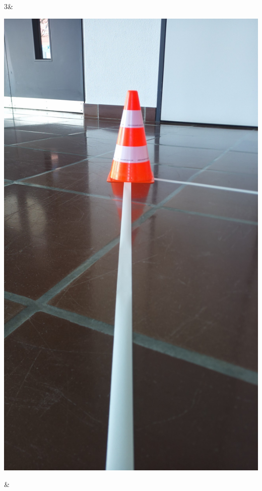 \begin{table}[H]
\begin{tabularx}
        3&
\begin{minipage}{.18\textwidth}
\includegraphics[width=\linewidth]{assets/IT/testing/yolo/pylon.jpg}
\end{minipage}
        &
\begin{minipage}{.18\textwidth}

\end{minipage}
\end{tabularx}
\end{table}
